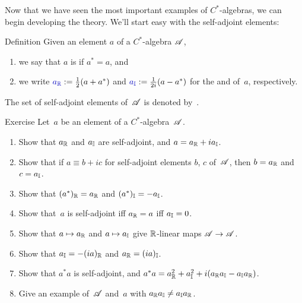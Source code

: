 \documentclass[a]{subfiles}
\begin{document}
\begin{parsec}%
\begin{point}%
Now that we have seen the most important examples
of $C^*$-algebras,
we can begin developing the theory.
We'll start easy with the self-adjoint elements:
\end{point}
\begin{point}{Definition}%
Given an element $a$ of a $C^*$-algebra $\mathscr{A}$, 
\begin{enumerate}
\item we say that $a$ is %
 if $a^* =a$, and
\item we write $\Define{\Real{a}}:= \frac{1}{2}(a+a^*)$
and $\Define{\Imag{a}}:=\frac{1}{2i}(a-a^*)$
for the  and %
%
%
%
of~$a$, respectively.
\end{enumerate}
The set of self-adjoint elements of~$\mathscr{A}$
is denoted by~\Define{$\sa{\scrA}$}.%
\end{point}
\begin{point}{Exercise}%
Let~$a$ be an element of a $C^*$-algebra~$\mathscr{A}$.
\begin{enumerate}
\item 
Show that $a_{\mathbb{R}}$ and $a_{\mathbb{I}}$ are self-adjoint,
and  $a= a_{\mathbb{R}}+ia_{\mathbb{I}}$.
\item
Show that if $a\equiv b+ic$ for self-adjoint elements $b$, $c$ of~$\mathscr{A}$,
then $b=a_{\mathbb{R}}$ and~$c=a_{\mathbb{I}}$.
\item
Show that $(a^*)_{\mathbb{R}}=a_{\mathbb{R}}$ and $(a^*)_{\mathbb{I}}=-a_{\mathbb{I}}$.
\item 
Show that~$a$ is self-adjoint iff $a_{\mathbb{R}}=a$ iff $a_{\mathbb{I}}=0$.
\item
Show that $a\mapsto a_{\mathbb{R}}$ and $a\mapsto a_{\mathbb{I}}$
give $\mathbb{R}$-linear maps $\mathscr{A}\to\mathscr{A}$.
\item
Show that $a_{\mathbb{I}} = -(ia)_{\mathbb{R}}$ and $a_{\mathbb{R}}=(ia)_{\mathbb{I}}$.
\item
Show that $a^*a$ is self-adjoint,
and  $a^*a=a_{\mathbb{R}}^2+a_{\mathbb{I}}^2+i(a_{\mathbb{R}}a_{\mathbb{I}}-a_{\mathbb{I}}a_{\mathbb{R}})$.
\item
Give an example of~$\mathscr{A}$ and~$a$ 
with  $a_{\mathbb{R}}a_{\mathbb{I}} \neq a_{\mathbb{I}}a_{\mathbb{R}}$.


\end{enumerate}
\end{point}
\end{parsec}
\end{document}
